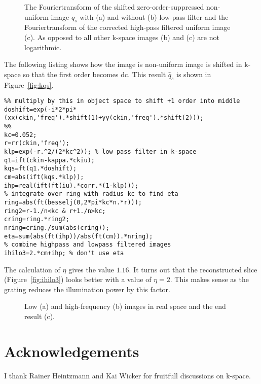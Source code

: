 \documentclass[11pt]{scrartcl}
\newcommand{\figref}[1]{Figure~\ref{#1}}
\begin{document}
\begin{figure}[htb]
  \centering {}
  \caption{The Fouriertransform of the shifted zero-order-suppressed
    non-uniform image $q_s$ with (a) and without (b) low-pass filter
    and the Fouriertransform of the corrected high-pass filtered
    uniform image (c). As opposed to all other k-space images (b) and
    (c) are not logarithmic.}
  \label{fig:hilo3_2}
\end{figure}

The following listing shows how the image is non-uniform image is
shifted in k-space so that the first order becomes dc. This result
$\hat q_s$ is shown in \figref{fig:kqs}.
\begin{lstlisting}
%% multiply by this in object space to shift +1 order into middle
doshift=exp(-i*2*pi*(xx(ckin,'freq').*shift(1)+yy(ckin,'freq').*shift(2)));
%%
kc=0.052;
r=rr(ckin,'freq');
klp=exp(-r.^2/(2*kc^2)); % low pass filter in k-space
q1=ift(ckin-kappa.*ckiu);
kqs=ft(q1.*doshift);
cm=abs(ift(kqs.*klp));
ihp=real(ift(ft(iu).*corr.*(1-klp)));
% integrate over ring with radius kc to find eta
ring=abs(ft(besselj(0,2*pi*kc*n.*r)));
ring2=r-1./n<kc & r+1./n>kc;
cring=ring.*ring2;
nring=cring./sum(abs(cring));
eta=sum(abs(ft(ihp))/abs(ft(cm)).*nring);
% combine highpass and lowpass filtered images
ihilo3=2.*cm+ihp; % don't use eta
\end{lstlisting}
The calculation of $\eta$ gives the value $1.16$. It turns out that
the reconstructed slice (\figref{fig:ihilo3}) looks better with a
value of $\eta=2$. This makes sense as the grating reduces the
illumination power by this factor. 
\begin{figure}[htb]
  \centering \subfigure[ {\tt
    cm}]{\label{fig:cm}\texttt{[image: cm]}}
  \caption{Low (a) and high-frequency (b) images in real space and the
    end result (c).}
  \label{fig:hilo3_3}
\end{figure}

\section{Acknowledgements}
I thank Rainer Heintzmann and Kai Wicker for fruitfull discussions
on k-space.



\end{document}
